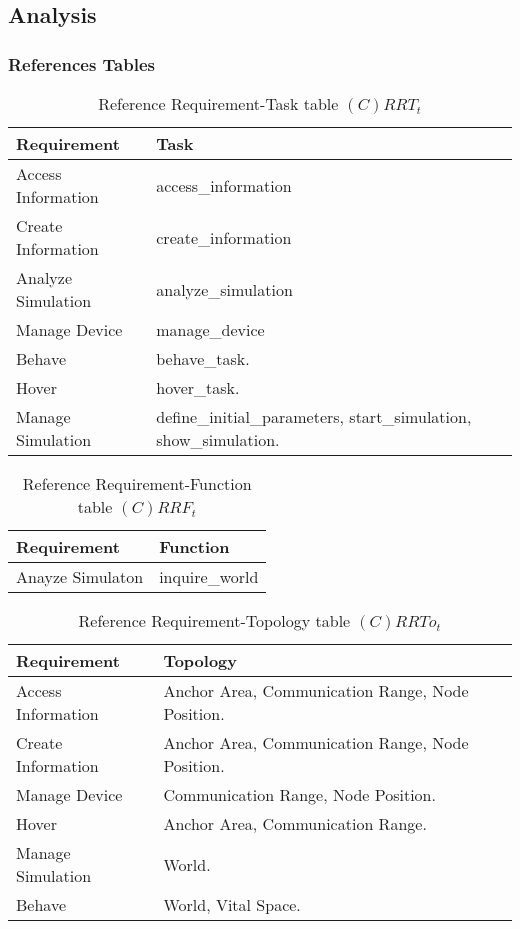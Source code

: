 \subsection{Analysis}

\subsubsection{References Tables}

\begin{table}[H]
	\centering
	\begin{tabular}{|p{4cm}|p{8cm}|}
			\hline
			\textbf{Requirement} & \textbf{Task} \\
			\hline
			Access Information & access\_information \\
			\hline
			Create Information & create\_information \\
			\hline
			Analyze Simulation & analyze\_simulation \\
			\hline
			Manage Device & manage\_device \\
			\hline
			Behave & behave\_task. \\
			\hline
			Hover & hover\_task. \\
			\hline
			Manage Simulation & define\_initial\_parameters, start\_simulation, show\_simulation. \\
			\hline
		\end{tabular}
	\caption{Reference Requirement-Task table $(C)RRT_t$}
	\label{tab:crrtt}
\end{table}

\begin{table}[H]
	\centering
	\begin{tabular}{|p{4cm}|p{8cm}|}
			\hline
			\textbf{Requirement} & \textbf{Function} \\
			\hline
			Anayze Simulaton & inquire\_world \\
			\hline
		\end{tabular}
	\caption{Reference Requirement-Function table $(C)RRF_t$}
	\label{tab:crrft}
\end{table}

\begin{table}[H]
	\centering
	\begin{tabular}{|p{4cm}|p{8cm}|}
			\hline
			\textbf{Requirement} & \textbf{Topology} \\
			\hline
			Access Information & Anchor Area, Communication Range, Node Position. \\
			\hline
			Create Information & Anchor Area, Communication Range, Node Position. \\
			\hline
			Manage Device & Communication Range, Node Position. \\
			\hline
			Hover & Anchor Area, Communication Range. \\
			\hline
			Manage Simulation & World. \\
			\hline
			Behave & World, Vital Space. \\
			\hline
		\end{tabular}
	\caption{Reference Requirement-Topology table $(C)RRTo_t$}
	\label{tab:crrtot}
\end{table}

